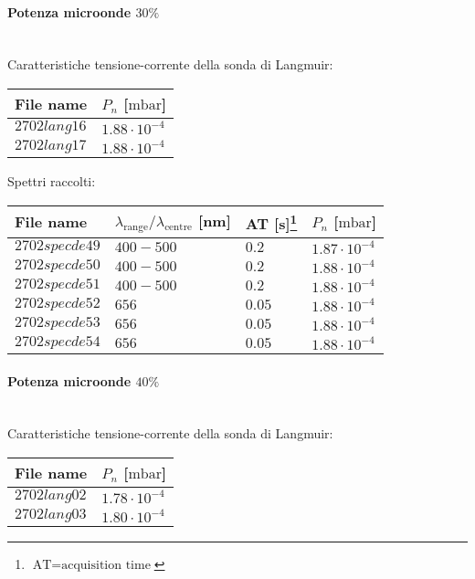 \paragraph*{Potenza microonde $\text{30\%}$} ~\\
Caratteristiche tensione-corrente della sonda di Langmuir:
\begin{center}
  \begin{tabular}{p{3cm}p{3cm}}
  \toprule
File name	&$P_{n}$ [$\si{\milli\bar}$]\\
  \midrule
$2702lang16$	&$1.88\cdot10^{-4}$\\
$2702lang17$	&$1.88\cdot10^{-4}$\\

  \bottomrule
  \end{tabular}
\end{center}

Spettri raccolti:
\begin{center}
\begin{tabular}{p{3cm}p{4cm}p{2cm}p{3cm}}
\toprule
File name	&$\lambda_\text{range}\text{/}\lambda_\text{centre}$ [nm] &AT [s]\footnote{$\text{AT}=\text{acquisition time}$} &$P_{n}$ [$\si{\milli\bar}$]\\
\midrule
$2702specde49$	&$400-500$	&$0.2$		&$1.87\cdot10^{-4}$\\
$2702specde50$	&$400-500$	&$0.2$		&$1.88\cdot10^{-4}$\\
$2702specde51$	&$400-500$	&$0.2$		&$1.88\cdot10^{-4}$\\
$2702specde52$	&$656$		&$0.05$		&$1.88\cdot10^{-4}$\\
$2702specde53$	&$656$		&$0.05$		&$1.88\cdot10^{-4}$\\
$2702specde54$	&$656$		&$0.05$		&$1.88\cdot10^{-4}$\\

\bottomrule
\end{tabular}
\end{center}

\paragraph*{Potenza microonde $\text{40\%}$} ~\\
Caratteristiche tensione-corrente della sonda di Langmuir:
\begin{center}
\begin{tabular}{p{3cm}p{3cm}}
\toprule
File name	&$P_n$ [$\si{\milli\bar}$]\\
\midrule
$2702lang02$	&$1.78\cdot10^{-4}$\\
$2702lang03$	&$1.80\cdot10^{-4}$\\
\bottomrule
\end{tabular}
\end{center}

